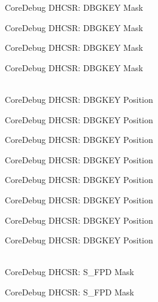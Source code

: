 \begin{DoxyRefList}
\label{deprecated__deprecated000302}%
%
Core\+Debug DHCSR:\+ DBGKEY Mask 

\label{deprecated__deprecated000378}%
%
Core\+Debug DHCSR:\+ DBGKEY Mask 

\label{deprecated__deprecated000457}%
%
Core\+Debug DHCSR:\+ DBGKEY Mask 

\label{deprecated__deprecated000559}%
%
Core\+Debug DHCSR:\+ DBGKEY Mask  
\item[{\parbox[t]{\linewidth}{Global \doxylink{group__CMSIS__CoreDebug_gac91280edd0ce932665cf75a23d11d842}{Core\+Debug\+\_\+\+DHCSR\+\_\+\+DBGKEY\+\_\+\+Pos} }}]\hfill \\
\label{deprecated__deprecated000005}%
%
Core\+Debug DHCSR:\+ DBGKEY Position 

\label{deprecated__deprecated000105}%
%
Core\+Debug DHCSR:\+ DBGKEY Position 

\label{deprecated__deprecated000159}%
%
Core\+Debug DHCSR:\+ DBGKEY Position 

\label{deprecated__deprecated000244}%
%
Core\+Debug DHCSR:\+ DBGKEY Position 

\label{deprecated__deprecated000301}%
%
Core\+Debug DHCSR:\+ DBGKEY Position 

\label{deprecated__deprecated000377}%
%
Core\+Debug DHCSR:\+ DBGKEY Position 

\label{deprecated__deprecated000456}%
%
Core\+Debug DHCSR:\+ DBGKEY Position 

\label{deprecated__deprecated000558}%
%
Core\+Debug DHCSR:\+ DBGKEY Position  
\item[{\parbox[t]{\linewidth}{Global \doxylink{group__CMSIS__SCB_gae37ad624177fe2d3298fd32d528805aa}{Core\+Debug\+\_\+\+DHCSR\+\_\+\+S\+\_\+\+FPD\+\_\+\+Msk} }}]\hfill \\
\label{deprecated__deprecated000014}%
%
Core\+Debug DHCSR:\+ S\+\_\+\+FPD Mask 

\label{deprecated__deprecated000465}%
%
Core\+Debug DHCSR:\+ S\+\_\+\+FPD Mask 


\end{DoxyRefList}
